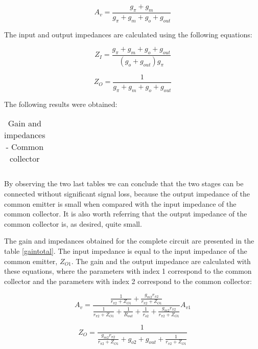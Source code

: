 \begin{equation}
        A_v = \frac{g_{\pi}+g_m}{g_{\pi}+g_m+g_o+g_{out}}
\end{equation}

The input and output impedances are calculated using the following equations:

\begin{equation}
        Z_I = \frac{g_{\pi}+g_m+g_o+g_{out}}{(g_o+g_{out})g_{\pi}}
\end{equation}

\begin{equation}
        Z_O = \frac{1}{g_{\pi}+g_m+g_o+g_{out}}
\end{equation}

The following results were obtained:

\begin{table}[H]
  \centering
  \begin{tabular}{|c|c|}
    \hline
        
        \hline
  \end{tabular}
  \caption{Gain and impedances - Common collector}
  \label{gaincollector}
\end{table}

By observing the two last tables we can conclude that the two stages can be connected without significant signal loss, because the output impedance of the common emitter is small when compared with the input impedance of the common collector. It is also worth referring that the output impedance of the common collector is, as desired, quite small.

The gain and impedances obtained for the complete circuit are presented in the table \ref{gaintotal}. The input impedance is equal to the input impedance of the common emitter, $Z_{O1}$. The gain and the output impedance are calculated with these equations, where the parameters with index 1 correspond to the common collector and the parameters with index 2 correspond to the common collector:

\begin{equation}
        A_v = \frac{\frac{1}{r_{\pi2}+Z_{O1}}+\frac{g_{m2}r_{\pi2}}{r_{\pi2}+Z_{O1}}}{\frac{1}{r_{\pi2}+Z_{O1}}+\frac{1}{R_{out}}+\frac{1}{r_{o2}}+\frac{g_{m2}r_{\pi2}}{r_{\pi2}+Z_{O1}}} A_{v1}
\end{equation}

\begin{equation}
        Z_O = \frac{1}{\frac{g_{m2}r_{\pi2}}{r_{\pi2}+Z_{O1}}+g_{o2}+g_{out}+\frac{1}{r_{\pi2}+Z_{O1}}}
\end{equation}

